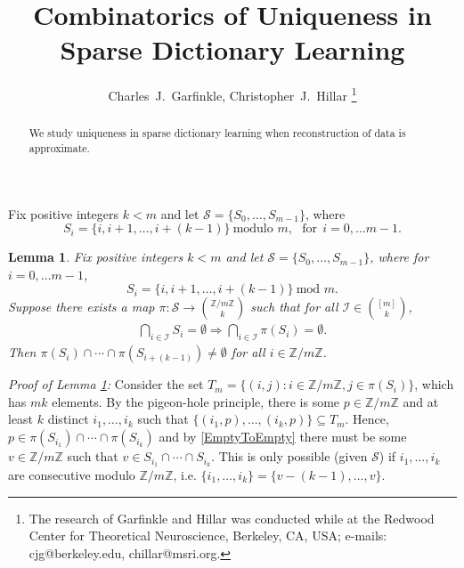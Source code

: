 \documentclass[journal, onecolumn]{IEEEtran}
\newtheorem{lemma}{Lemma}
\begin{document}
\title{Combinatorics of Uniqueness in Sparse Dictionary Learning}

\author{Charles~J.~Garfinkle,  Christopher~J.~Hillar%
\thanks{The research of Garfinkle and Hillar was conducted while at the Redwood Center for Theoretical Neuroscience, Berkeley, CA, USA; e-mails: cjg@berkeley.edu, chillar@msri.org.}}%

\maketitle

\begin{abstract}
We study uniqueness in sparse dictionary learning when reconstruction of data is approximate.
\end{abstract}

Fix positive integers $k < m$ and let $\mathcal{S} = \{S_0,\ldots,S_{m-1}\}$, where
\[S_{i} = \{i, i + 1, \ldots, i + (k-1)\}  \ \text{modulo } m, \ \ \ \text{for}  \ \ i = 0, \ldots m -1.\]

\begin{lemma}\label{NonEmptyLemma} Fix positive integers $k < m$ and let $\mathcal{S} = \{S_0,\ldots,S_{m-1}\}$, where for $i = 0, \ldots m -1$,
\[S_{i} = \{i, i + 1, \ldots, i + (k-1)\}  \ \text{mod } m.\]
Suppose there exists a map $\pi: \mathcal{S} \to {\mathbb{Z}/m\mathbb{Z} \choose k}$ such that for all $ \mathcal{I} \in {[m] \choose k}$,
\begin{align}\label{EmptyToEmpty}
 \bigcap_{i \in \mathcal{I}} S_i = \emptyset \Longrightarrow \bigcap_{i \in \mathcal{I}} \pi(S_i) = \emptyset.
\end{align}
%
Then  $\pi(S_i) \cap \cdots \cap \pi(S_{i+(k-1)}) \neq \emptyset$ for all $i \in \mathbb{Z}/m\mathbb{Z}$.
\end{lemma}

\emph{Proof of Lemma \ref{NonEmptyLemma}:} Consider the set $T_m = \{ (i,j) : i \in \mathbb{Z}/m\mathbb{Z}, j \in \pi(S_i) \}$, which has $mk$ elements. By the pigeon-hole principle, there is some $p \in \mathbb{Z}/m\mathbb{Z}$ and at least $k$ distinct $i_1, \ldots, i_k$ such that $\{(i_1, p), \ldots, (i_k, p)\} \subseteq T_m$. Hence, $p \in \pi(S_{i_1}) \cap \cdots \cap \pi(S_{i_k})$ and by \eqref{EmptyToEmpty} there must be some $v \in \mathbb{Z}/m\mathbb{Z}$ such that $v \in S_{i_1} \cap \cdots \cap S_{i_k}$. This is only possible (given $\mathcal{S}$) if $i_1, \ldots, i_k$ are consecutive modulo $\mathbb{Z}/m\mathbb{Z}$, i.e. $\{i_1, \ldots, i_k\} = \{v - (k-1), \ldots, v\}$. 
\end{document}
